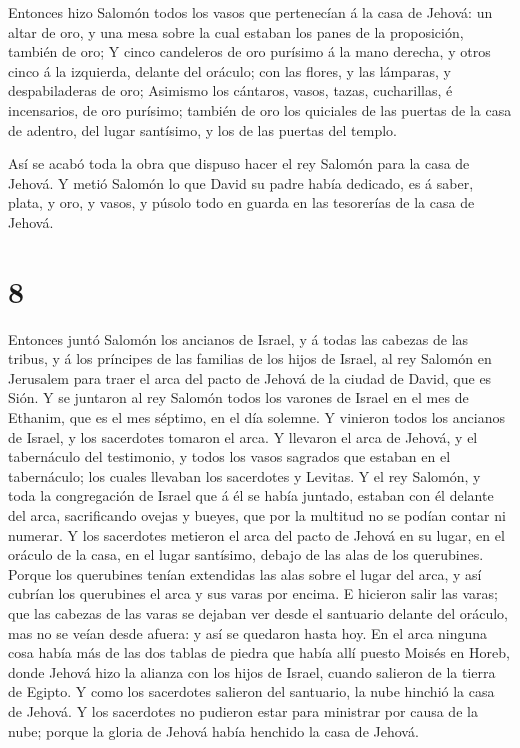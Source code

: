  Entonces hizo Salomón todos los vasos que pertenecían á la
casa de Jehová: un altar de oro, y una mesa sobre la cual estaban los
panes de la proposición, también de oro;  Y cinco
candeleros de oro purísimo á la mano derecha, y otros cinco á la
izquierda, delante del oráculo; con las flores, y las lámparas, y
despabiladeras de oro;  Asimismo los cántaros, vasos,
tazas, cucharillas, é incensarios, de oro purísimo; también de oro los
quiciales de las puertas de la casa de adentro, del lugar santísimo, y
los de las puertas del templo.

 Así se acabó toda la obra que dispuso hacer el rey Salomón
para la casa de Jehová. Y metió Salomón lo que David su padre había
dedicado, es á saber, plata, y oro, y vasos, y púsolo todo en guarda en
las tesorerías de la casa de Jehová.

\hypertarget{section-7}{%
\section{8}\label{section-7}}

 Entonces juntó Salomón los ancianos de Israel, y á todas
las cabezas de las tribus, y á los príncipes de las familias de los
hijos de Israel, al rey Salomón en Jerusalem para traer el arca del
pacto de Jehová de la ciudad de David, que es Sión.  Y se
juntaron al rey Salomón todos los varones de Israel en el mes de
Ethanim, que es el mes séptimo, en el día solemne.  Y
vinieron todos los ancianos de Israel, y los sacerdotes tomaron el arca.
 Y llevaron el arca de Jehová, y el tabernáculo del
testimonio, y todos los vasos sagrados que estaban en el tabernáculo;
los cuales llevaban los sacerdotes y Levitas.  Y el rey
Salomón, y toda la congregación de Israel que á él se había juntado,
estaban con él delante del arca, sacrificando ovejas y bueyes, que por
la multitud no se podían contar ni numerar.  Y los
sacerdotes metieron el arca del pacto de Jehová en su lugar, en el
oráculo de la casa, en el lugar santísimo, debajo de las alas de los
querubines.  Porque los querubines tenían extendidas las
alas sobre el lugar del arca, y así cubrían los querubines el arca y sus
varas por encima.  E hicieron salir las varas; que las
cabezas de las varas se dejaban ver desde el santuario delante del
oráculo, mas no se veían desde afuera: y así se quedaron hasta hoy.
 En el arca ninguna cosa había más de las dos tablas de
piedra que había allí puesto Moisés en Horeb, donde Jehová hizo la
alianza con los hijos de Israel, cuando salieron de la tierra de Egipto.
 Y como los sacerdotes salieron del santuario, la nube
hinchió la casa de Jehová.  Y los sacerdotes no pudieron
estar para ministrar por causa de la nube; porque la gloria de Jehová
había henchido la casa de Jehová.

